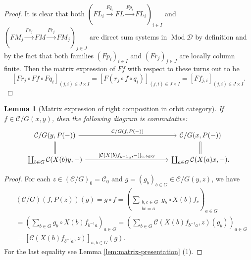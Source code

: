 \documentclass{surv-l}
\numberwithin{equation}{chapter}
\numberwithin{figure}{chapter}
\theoremstyle{plain}
\newtheorem{lem}[thm]{Lemma}
\theoremstyle{definition}
\theoremstyle{remark}
\newcommand{\Ar}[3]{\ar[from={#1}, to={#2}, #3]}
\DeclareMathOperator{\Mod}{Mod}
\DeclareMathOperator{\blank}{-}
\begin{document}
\begin{proof}
It is clear that both $(FL_i \xrightarrow{Fq_i} FL \xrightarrow{Fp_i} FL_i)_{i \in I}$ and $(FM_j \xrightarrow{Fs_j} FM \xrightarrow{Fr_j} FM_j)_{j \in J}$
are direct sum systems in $\Mod{\mathcal{D}}$ by definition and by the fact that both families
$(Fp_i)_{i\in I}$ and $(Fr_j)_{j\in J}$ are locally column finite.
Then the matrix expression of $Ff$ with respect to these turns out to be
\[
[Fr_j \circ Ff \circ Fq_i]_{(j,i) \in J\times I}
= [F(r_j \circ f \circ q_i)]_{(j,i) \in J\times I}
= [Ff_{j,i}]_{(j,i) \in J\times I}.
\]
\end{proof}

\begin{lem}[Matrix expression of right composition in orbit category]\label{lem:mat-pres-orbit-multi}
If $f \in {\mathcal{C}}/G(x, y)$, then the following diagram is commutative:
\[
\begin{tikzcd}[column sep=12em]
{\mathcal{C}}/G(y, P(\blank)) & {\mathcal{C}}/G(x, P(\blank))\\
\coprod_{b\in G}{\mathcal{C}}(X(b)y, \blank) & \coprod_{a\in G}{\mathcal{C}}(X(a)x, \blank).
\Ar{1-1}{1-2}{"{{\mathcal{C}}/G(f, P(\blank))}"}
\Ar{2-1}{2-2}{"{[{\mathcal{C}}(X(b)f_{b^{-1} a}, \blank)]_{a,b\in G}}"}
\Ar{1-1}{2-1}{equal}
\Ar{1-2}{2-2}{equal}
\end{tikzcd}
\]
\end{lem}

\begin{proof}
For each $z \in ({\mathcal{C}}/G)_0 = {\mathcal{C}}_0$ and
$g = (g_b)_{b\in G} \in {\mathcal{C}}/G(y, z)$, we have
\[
\begin{aligned}
&({\mathcal{C}}/G)(f, P(z))(g) = g \circ f = \left(\sum_{\begin{smallmatrix} b,c\in G\\bc=a \end{smallmatrix}}g_b \circ X(b)f_c\right)_{a \in G}\\
&= \left(\sum_{b\in G}g_b \circ X(b)f_{b^{-1} a}\right)_{a \in G}
=\left(\sum_{b\in G}{\mathcal{C}}(X(b)f_{b^{-1} a}, z)(g_b)\right)_{a \in G}\\
&= [{\mathcal{C}}(X(b)f_{b^{-1} a}, z)]_{a,b\in G}(g).
\end{aligned}
\]
For the last equality see Lemma  \ref{lem:matrix-presentation} (1).
\end{proof}
\end{document}
